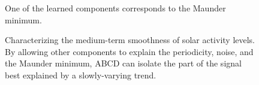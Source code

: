 \documentclass[letterpaper]{article}
\newcommand{\procedurename}{ABCD}
\begin{document}
\begin{figure}[ht]
\centering
{}
\caption{One of the learned components corresponds to the Maunder minimum.}
\label{fig:maunder}
\end{figure}
%
%
%
\begin{figure}[h!]
\centering
{}
\caption{Characterizing the medium-term smoothness of solar activity levels.  By allowing other components to explain the periodicity, noise, and the Maunder minimum, \procedurename{} can isolate the part of the signal best explained by a slowly-varying trend.}
\label{fig:smooth}
\end{figure}
\end{document}
